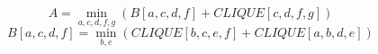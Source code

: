\documentclass{article}
\begin{document}
$$ A =\min_{ a,c,d,f,g } \left( B\left[a,c,d,f\right]+CLIQUE\left[c,d,f,g\right]\right) $$
$$ B\left[ a,c,d,f \right] =\min_{ b,e } \left( CLIQUE\left[b,c,e,f\right]+CLIQUE\left[a,b,d,e\right]\right) $$
\end{document}
